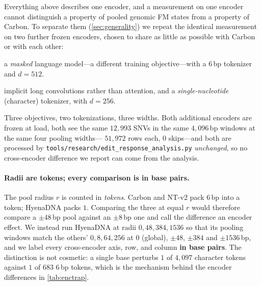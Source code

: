 \documentclass{article}
\begin{document}
Everything above describes one encoder, and a measurement on one encoder cannot distinguish a
property of pooled genomic FM states from a property of Carbon. To separate them
(\cref{sec:generality}) we repeat the identical measurement on two further frozen encoders, chosen
to share as little as possible with Carbon or with each other:
\begin{description}[leftmargin=1.2em,itemsep=1pt,topsep=2pt]
\item[Nucleotide Transformer v2, $100$M multi-species~\citep{nucleotidetransformer2025}:] a
\emph{masked} language model---a different training objective---with a $6$\,bp tokenizer and
$d{=}512$.
\item[HyenaDNA-450k~\citep{hyenadna2023}:] implicit long convolutions rather than attention, and a
\emph{single-nucleotide} (character) tokenizer, with $d{=}256$.
\end{description}
Three objectives, two tokenizations, three widths. Both additional encoders are frozen at load, both
see the same $12{,}993$ SNVs in the same $4{,}096$\,bp windows at the same four pooling widths---%
$51{,}972$ rows each, $0$ skips---and both are processed by
\texttt{tools/research/edit\_response\_analysis.py} \emph{unchanged}, so no cross-encoder difference
we report can come from the analysis.

\paragraph{Radii are tokens; every comparison is in base pairs.} The pool radius $r$ is counted in
\emph{tokens}. Carbon and NT-v2 pack $6$\,bp into a token; HyenaDNA packs $1$. Comparing the three
at equal $r$ would therefore compare a $\pm48$\,bp pool against an $\pm8$\,bp one and call the
difference an encoder effect. We instead run HyenaDNA at radii $0,48,384,1536$ so that its pooling
windows match the others' $0,8,64,256$ at $0$ (global), $\pm48$, $\pm384$ and $\pm1536$\,bp, and we
label every cross-encoder axis, row, and column \textbf{in base pairs}. The distinction is not
cosmetic: a single base perturbs $1$ of $4{,}097$ character tokens against $1$ of $683$ $6$\,bp
tokens, which is the mechanism behind the encoder differences in \cref{tab:enctrap}.
\end{document}
